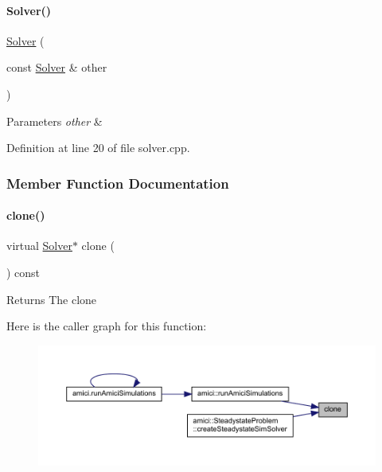 \paragraph{\texorpdfstring{Solver()}{Solver()}}
{\footnotesize\ttfamily \mbox{\hyperlink{classamici_1_1_solver}{Solver}} (\begin{DoxyParamCaption}\item[{const \mbox{\hyperlink{classamici_1_1_solver}{Solver}} \&}]{other }\end{DoxyParamCaption})}


\begin{DoxyParams}{Parameters}
{\em other} & \\
\hline
\end{DoxyParams}


Definition at line 20 of file solver.\+cpp.



\subsubsection{Member Function Documentation}
\mbox{\label{classamici_1_1_solver_ad40c0e06f5ee35afc1dd60e9f80ac5be}} 
\paragraph{\texorpdfstring{clone()}{clone()}}
{\footnotesize\ttfamily virtual \mbox{\hyperlink{classamici_1_1_solver}{Solver}}$\ast$ clone (\begin{DoxyParamCaption}{ }\end{DoxyParamCaption}) const\hspace{0.3cm}{\ttfamily [pure virtual]}}

\begin{DoxyReturn}{Returns}
The clone 
\end{DoxyReturn}
Here is the caller graph for this function\+:
\nopagebreak
\begin{figure}[H]
\begin{center}
\leavevmode
\includegraphics[width=350pt]{classamici_1_1_solver_ad40c0e06f5ee35afc1dd60e9f80ac5be_icgraph}
\end{center}
\end{figure}
\mbox{\label{classamici_1_1_solver_a5cffde567803181ec12c71117c74b47a}} 
